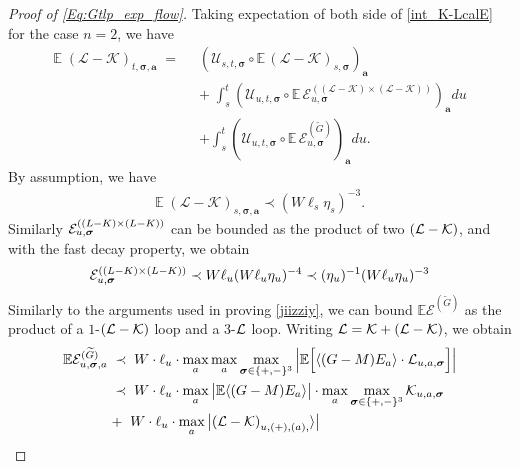 \documentclass[10pt,reqno]{article}
\theoremstyle{plain} %
\theoremstyle{remark}
\numberwithin{equation}{section}
\begin{document}
\begin{proof}[Proof of \eqref{Eq:Gtlp_exp_flow}]
Taking expectation of both side of  \eqref{int_K-LcalE} for the case $n=2$, we have  
\begin{align}\label{Eexpint_K-L}
 \mathbb E\;    (\mathcal{L} - \mathcal{K})_{t, \boldsymbol{\sigma}, \textbf{a}} \;=
 \; \; &
    \left(\mathcal{U}_{s, t, \boldsymbol{\sigma}} \circ  \mathbb E\, (\mathcal{L} - \mathcal{K})_{s, \boldsymbol{\sigma}}\right)_{\textbf{a}} \\ 
    &+ \;  \int_{s}^t \left(\mathcal{U}_{u, t, \boldsymbol{\sigma}}  \circ \mathbb E\,\mathcal{E}^{((\mathcal{L} - \mathcal{K}) \times (\mathcal{L} - \mathcal{K}))}_{u, \boldsymbol{\sigma}}\right)_{\textbf{a}} du \\
    &+   \int_{s}^t \left(\mathcal{U}_{u, t, \boldsymbol{\sigma}} \circ  \mathbb E\, \mathcal{E}^{(\widetilde{G})}_{u, \boldsymbol{\sigma}}\right)_{\textbf{a}} du.
\end{align} 
By assumption, we have 
\begin{align}\label{jdasfuao01}
  \mathbb E\;  (\mathcal{L} - \mathcal{K})_{s, \boldsymbol{\sigma},\textbf{a}}\prec (W\ell_s\eta_s)^{-3}.
\end{align}
Similarly ${\cal E}^{( (L-K)\times(L-K) )}_{u, \boldsymbol{\sigma}}$ can be bounded as the product of two ${\cal (L-K)}$, and with the fast decay property, we obtain  
\begin{align}\label{jdasfuao02}
 {\cal E}^{( (L-K)\times(L-K) )}_{u, \boldsymbol{\sigma}}\prec W\ell_u (W\ell_u\eta_u)^{-4}\prec (\eta_u)^{-1} (W\ell_u\eta_u)^{-3}
\end{align}
Similarly to the arguments used in proving \eqref{jiizziy}, we can bound $\mathbb E \mathcal{E}^{(\widetilde{G})}$ as   the product of a 
$1$-${\cal (L-K)}$ loop and a $3$-$\cal L$ loop. Writing  ${\cal L}={\cal K}+({\cal L} -{\cal K})$, we  obtain  
\begin{align}
    \mathbb E \mathcal{E}^{(\widetilde{G})}_{u, \boldsymbol{\sigma},\textbf{a}}
   \; \prec \; & \;
W\cdot\ell_u\cdot  \max_a \max_{\textbf{a}}\max_{ \boldsymbol{\sigma}\in \{+,-\}^3} \Big|\mathbb E
\Big [ \langle (G-M) E_a\rangle \cdot {\cal L}_{u,\textbf{a}, \boldsymbol{\sigma} } \Big ] \Big|
 \nonumber \\
  \; \prec \; & \;
W\cdot\ell_u\cdot \max_a  \big|\mathbb E \langle (G-M) E_a\rangle \big|
 \cdot 
 \max_{\textbf{a}}\max_{ \boldsymbol{\sigma}\in \{+,-\}^3} {\cal K}_{u,\textbf{a}, \boldsymbol{\sigma} }
\nonumber \\
 + \; \;& W\cdot\ell_u\cdot \max_a \big|{({\cal L-\cal K})}_{u,(+), (a),   }\rangle \big|

\end{align}
\end{proof}
\end{document}
